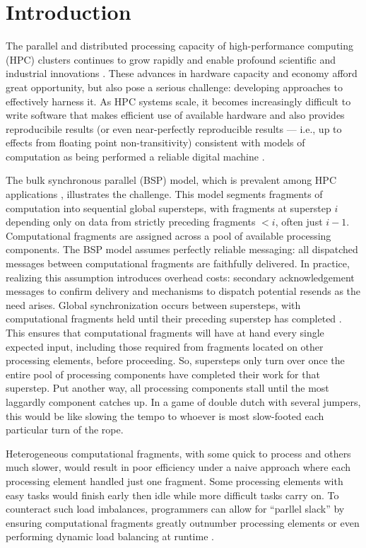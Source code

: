 

\section{Introduction}

The parallel and distributed processing capacity of high-performance computing (HPC) clusters continues to grow rapidly and enable profound scientific and industrial innovations \citep{gagliardi2019international}.
These advances in hardware capacity and economy afford great opportunity, but also pose a serious challenge: developing approaches to effectively harness it.
As HPC systems scale, it becomes increasingly difficult to write software that makes efficient use of available hardware and also provides reproducibile results (or even near-perfectly reproducible results --- i.e., up to effects from floating point non-transitivity) consistent with models of computation as being performed a reliable digital machine \citep{heroux2014toward}.

The bulk synchronous parallel (BSP) model, which is prevalent among HPC applications \citep{dongarra2014applied}, illustrates the challenge.
This model segments fragments of computation into sequential global supersteps, with fragments at superstep $i$ depending only on data from strictly preceding fragments $<i$, often just $i-1$.
Computational fragments are assigned across a pool of available processing components.
The BSP model assumes perfectly reliable messaging: all dispatched messages between computational fragments are faithfully delivered.
In practice, realizing this assumption introduces overhead costs: secondary acknowledgement messages to confirm delivery and mechanisms to dispatch potential resends as the need arises.
Global synchronization occurs between supersteps, with computational fragments held until their preceding superstep has completed \citep{valiant1990bridging}.
This ensures that computational fragments will have at hand every single expected input, including those required from fragments located on other processing elements, before proceeding.
So, supersteps only turn over once the entire pool of processing components have completed their work for that superstep.
Put another way, all processing components stall until the most laggardly component catches up.
In a game of double dutch with several jumpers, this would be like slowing the tempo to whoever is most slow-footed each particular turn of the rope.

Heterogeneous computational fragments, with some quick to process and others much slower, would result in poor efficiency under a naive approach where each processing element handled just one fragment.
Some processing elements with easy tasks would finish early then idle while more difficult tasks carry on.
To counteract such load imbalances, programmers can allow for ``parllel slack'' by ensuring computational fragments greatly outnumber processing elements or even performing dynamic load balancing at runtime \citep{valiant1990bridging}.

